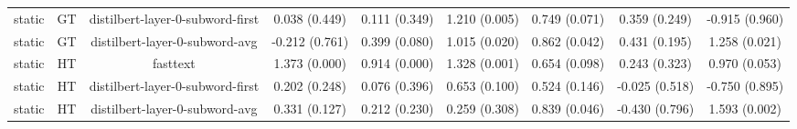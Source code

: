 \begin{sidewaystable}[htb]
\begin{tabular}{@{}ccccccccc@{}}
        static & GT & distilbert-layer-0-subword-first & 0.038 (0.449) & 0.111 (0.349) & 1.210 (0.005) & 0.749 (0.071) & 0.359 (0.249) & -0.915 (0.960) \\
        static & GT & distilbert-layer-0-subword-avg & -0.212 (0.761) & 0.399 (0.080) & 1.015 (0.020) & 0.862 (0.042) & 0.431 (0.195) & 1.258 (0.021) \\
        static & HT & fasttext & 1.373 (0.000) & 0.914 (0.000) & 1.328 (0.001) & 0.654 (0.098) & 0.243 (0.323) & 0.970 (0.053) \\
        static & HT & distilbert-layer-0-subword-first & 0.202 (0.248) & 0.076 (0.396) & 0.653 (0.100) & 0.524 (0.146) & -0.025 (0.518) & -0.750 (0.895) \\
        static & HT & distilbert-layer-0-subword-avg & 0.331 (0.127) & 0.212 (0.230) & 0.259 (0.308) & 0.839 (0.046) & -0.430 (0.796) & 1.593 (0.002) \\
        \bottomrule
    \end{tabular}
\end{sidewaystable}